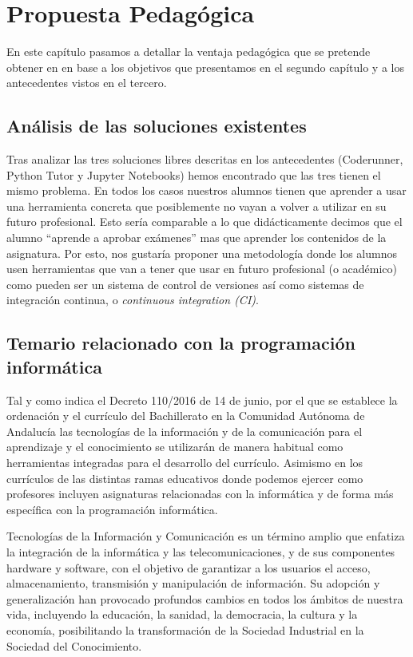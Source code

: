 \chapter{Propuesta Pedagógica}

En este capítulo pasamos a detallar la ventaja pedagógica que se pretende obtener en en base a los objetivos que presentamos en el segundo capítulo y a los antecedentes vistos en el tercero.


\section{Análisis de las soluciones existentes}

Tras analizar las tres soluciones libres descritas en los antecedentes (Coderunner, Python Tutor y Jupyter Notebooks) hemos encontrado que las tres tienen el mismo problema. En todos los casos nuestros alumnos tienen que aprender a usar una herramienta concreta que posiblemente no vayan a volver a utilizar en su futuro profesional. Esto sería comparable a lo que didácticamente decimos que el alumno ``aprende a aprobar exámenes'' mas que aprender los contenidos de la asignatura. Por esto, nos gustaría proponer una metodología donde los alumnos usen herramientas que van a tener que usar en futuro profesional (o académico) como pueden ser un sistema de control de versiones así como sistemas de integración continua, o \textit{continuous integration (CI)}.

\section {Temario relacionado con la programación informática}

Tal y como indica el Decreto 110/2016  de 14 de junio, por el que se establece la ordenación y el currículo del Bachillerato en la Comunidad Autónoma de Andalucía las tecnologías de la información y de la comunicación para el aprendizaje y el conocimiento se utilizarán de manera habitual como herramientas integradas para el desarrollo del currículo. Asimismo en los currículos de las distintas ramas educativos donde podemos ejercer como profesores incluyen asignaturas relacionadas con la informática y de forma más específica con la programación informática.

\bigskip
Tecnologías de la Información y Comunicación es un término amplio que enfatiza la integración de la informática y las telecomunicaciones, y de sus componentes hardware y software, con el objetivo de garantizar a
los usuarios el acceso, almacenamiento, transmisión y manipulación de información. Su adopción y generalización han provocado profundos cambios en todos los ámbitos de nuestra vida, incluyendo la educación, la sanidad, la democracia, la cultura y la economía, posibilitando la transformación de la Sociedad Industrial en la Sociedad del Conocimiento.

